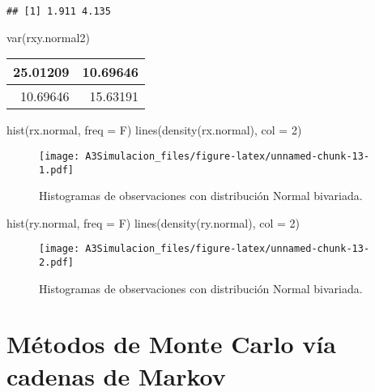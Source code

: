\documentclass[
  12pt,
  spanish,
]{book}
\newenvironment{Shaded}{\begin{snugshade}}{\end{snugshade}}
\newcommand{\AttributeTok}[1]{\textcolor[rgb]{0.77,0.63,0.00}{#1}}
\newcommand{\DecValTok}[1]{\textcolor[rgb]{0.00,0.00,0.81}{#1}}
\newcommand{\FunctionTok}[1]{\textcolor[rgb]{0.00,0.00,0.00}{#1}}
\newcommand{\NormalTok}[1]{#1}
\theoremstyle{definition}
\theoremstyle{definition}
\theoremstyle{definition}
\theoremstyle{definition}
\theoremstyle{remark}
\begin{document}
\begin{verbatim}
## [1] 1.911 4.135
\end{verbatim}

\begin{Shaded}
\begin{Highlighting}[]
\FunctionTok{var}\NormalTok{(rxy.normal2)}
\end{Highlighting}
\end{Shaded}

\begin{tabular}{r|r}
\hline
25.01209 & 10.69646\\
\hline
10.69646 & 15.63191\\
\hline
\end{tabular}

\begin{Shaded}
\begin{Highlighting}[]
\FunctionTok{hist}\NormalTok{(rx.normal, }\AttributeTok{freq =}\NormalTok{ F)}
\FunctionTok{lines}\NormalTok{(}\FunctionTok{density}\NormalTok{(rx.normal), }\AttributeTok{col =} \DecValTok{2}\NormalTok{)}
\end{Highlighting}
\end{Shaded}

\begin{figure}
\centering
\texttt{[image: A3Simulacion\_files/figure-latex/unnamed-chunk-13-1.pdf]}
\caption{\label{fig:unnamed-chunk-13-1}Histogramas de observaciones con distribución Normal bivariada.}
\end{figure}

\begin{Shaded}
\begin{Highlighting}[]
\FunctionTok{hist}\NormalTok{(ry.normal, }\AttributeTok{freq =}\NormalTok{ F)}
\FunctionTok{lines}\NormalTok{(}\FunctionTok{density}\NormalTok{(ry.normal), }\AttributeTok{col =} \DecValTok{2}\NormalTok{)}
\end{Highlighting}
\end{Shaded}

\begin{figure}
\centering
\texttt{[image: A3Simulacion\_files/figure-latex/unnamed-chunk-13-2.pdf]}
\caption{\label{fig:unnamed-chunk-13-2}Histogramas de observaciones con distribución Normal bivariada.}
\end{figure}

\hypertarget{muxe9todos-de-monte-carlo-vuxeda-cadenas-de-markov}{%
\section{Métodos de Monte Carlo vía cadenas de Markov}\label{muxe9todos-de-monte-carlo-vuxeda-cadenas-de-markov}}
\end{document}
